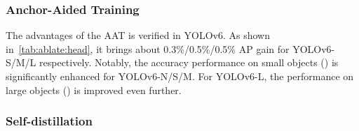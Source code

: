 \documentclass[10pt,twocolumn,letterpaper]{article}
\begin{document}
  \begin{table}
    \centering
    \caption{Ablation study about AAT.}
    \label{tab:ablate:head}
  \end{table}

  \subsubsection{Anchor-Aided Training}
    The advantages of the AAT is verified in YOLOv6. As shown in~\cref{tab:ablate:head}, it brings about 0.3\%/0.5\%/0.5\% AP gain for YOLOv6-S/M/L respectively. Notably, the accuracy performance on small objects () is significantly enhanced for YOLOv6-N/S/M. For YOLOv6-L, the performance on large objects () is improved even further.


\subsubsection{Self-distillation}
\end{document}
